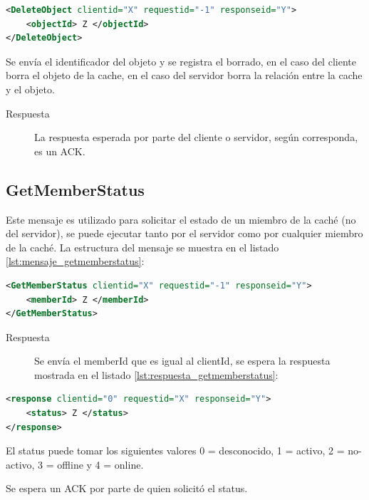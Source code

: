 \begin{lstlisting}[language=XML,caption={Mensaje de DeleteObject},label={lst:mensaje_deleteobject}]
<DeleteObject clientid="X" requestid="-1" responseid="Y"> 
	<objectId> Z </objectId>
</DeleteObject>
\end{lstlisting}

Se envía el identificador del objeto y se registra el borrado, en el caso del cliente borra el objeto de la cache, en el caso del servidor borra la relación entre la cache y el objeto.

\begin{description}
\item[Respuesta] La respuesta esperada por parte del cliente o servidor, según corresponda, es un ACK.
\end{description}

\subsection{GetMemberStatus}
\label{GetMemberStatus} 
Este mensaje es utilizado para solicitar el estado de un miembro de la caché (no del servidor), se puede ejecutar tanto por el servidor como por cualquier miembro de la caché. La estructura del mensaje se muestra en el listado \ref{lst:mensaje_getmemberstatus}:

\begin{lstlisting}[language=XML,caption={Mensaje de GetMemberStatus},label={lst:mensaje_getmemberstatus}]
<GetMemberStatus clientid="X" requestid="-1" responseid="Y"> 
	<memberId> Z </memberId>
</GetMemberStatus>
\end{lstlisting}

\begin{description}
\item[Respuesta] Se envía el memberId que es igual al clientId, se espera la respuesta mostrada en el listado \ref{lst:respuesta_getmemberstatus}:
\end{description}

\begin{lstlisting}[language=XML,caption={Mensaje de Respuesta de GetMemberStatus},label={lst:respuesta_getmemberstatus}]
<response clientid="0" requestid="X" responseid="Y"> 
	<status> Z </status>
</response>
\end{lstlisting}

El status puede tomar los siguientes valores 0 = desconocido, 1 = activo, 2 = no-activo, 3 = offline y 4 = online.

Se espera un ACK por parte de quien solicitó el status.

